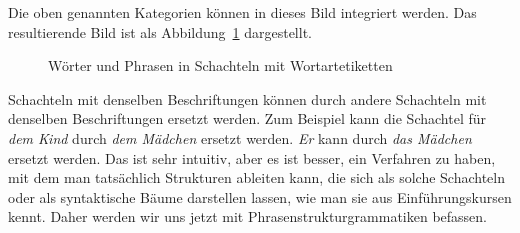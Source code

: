Die oben genannten Kategorien können in dieses Bild integriert werden. Das resultierende Bild ist als
Abbildung~\ref{fig-boxes-pos} dargestellt.
\begin{figure}
\centering
{}
\caption{\label{fig-boxes-pos}Wörter und Phrasen in Schachteln mit Wortartetiketten}
\end{figure}
Schachteln mit denselben Beschriftungen können durch andere Schachteln mit denselben Beschriftungen ersetzt werden. Zum Beispiel kann die Schachtel
für \emph{dem Kind} durch \emph{dem Mädchen} ersetzt werden. \emph{Er} kann
durch \emph{das Mädchen} ersetzt werden. Das ist sehr intuitiv, aber es ist besser, ein Verfahren zu haben,
mit dem man tatsächlich Strukturen ableiten kann, die sich als solche Schachteln oder als syntaktische
Bäume darstellen lassen, wie man sie aus Einführungskursen kennt. Daher werden wir uns jetzt mit
Phrasenstrukturgrammatiken befassen.

